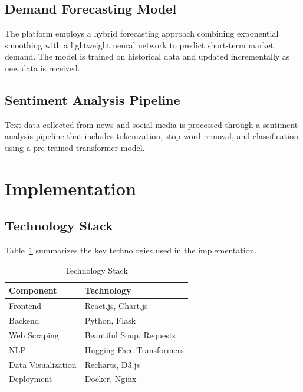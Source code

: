 \documentclass[conference]{IEEEtran}
\begin{document}
\subsection{Demand Forecasting Model}
The platform employs a hybrid forecasting approach combining exponential smoothing with a lightweight neural network to predict short-term market demand. The model is trained on historical data and updated incrementally as new data is received.

\subsection{Sentiment Analysis Pipeline}
Text data collected from news and social media is processed through a sentiment analysis pipeline that includes tokenization, stop-word removal, and classification using a pre-trained transformer model.

\section{Implementation}

\subsection{Technology Stack}
Table~\ref{tab:techstack} summarizes the key technologies used in the implementation.

\begin{table}[htbp]
\caption{Technology Stack}
\begin{center}
\begin{tabular}{ll}
\toprule
\textbf{Component} & \textbf{Technology} \\
\midrule
Frontend & React.js, Chart.js \\
Backend & Python, Flask \\
Web Scraping & Beautiful Soup, Requests \\
NLP & Hugging Face Transformers \\
Data Visualization & Recharts, D3.js \\
Deployment & Docker, Nginx \\
\bottomrule
\end{tabular}
\label{tab:techstack}
\end{center}
\end{table}
\end{document}

